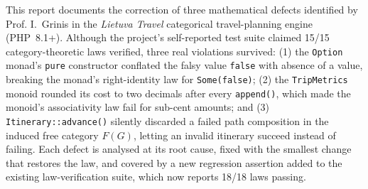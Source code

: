 This report documents the correction of three mathematical defects identified by Prof. I.~Grinis in the \emph{Lietuva Travel} categorical travel-planning engine (PHP~8.1+). Although the project's self-reported test suite claimed 15/15 category-theoretic laws verified, three real violations survived: (1) the \texttt{Option} monad's \texttt{pure} constructor conflated the falsy value \texttt{false} with absence of a value, breaking the monad's right-identity law for \texttt{Some(false)}; (2) the \texttt{TripMetrics} monoid rounded its cost to two decimals after every \texttt{append()}, which made the monoid's associativity law fail for sub-cent amounts; and (3) \texttt{Itinerary::advance()} silently discarded a failed path composition in the induced free category $F(G)$, letting an invalid itinerary succeed instead of failing. Each defect is analysed at its root cause, fixed with the smallest change that restores the law, and covered by a new regression assertion added to the existing law-verification suite, which now reports 18/18 laws passing.
